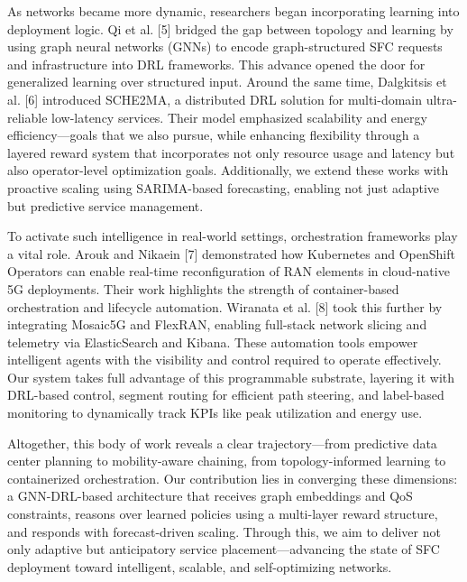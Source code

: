 \documentclass[conference]{IEEEtran}
\begin{document}
As networks became more dynamic, researchers began incorporating learning into deployment logic. Qi et al. [5] bridged the gap between topology and learning by using graph neural networks (GNNs) to encode graph-structured SFC requests and infrastructure into DRL frameworks. This advance opened the door for generalized learning over structured input. Around the same time, Dalgkitsis et al. [6] introduced SCHE2MA, a distributed DRL solution for multi-domain ultra-reliable low-latency services. Their model emphasized scalability and energy efficiency—goals that we also pursue, while enhancing flexibility through a layered reward system that incorporates not only resource usage and latency but also operator-level optimization goals. Additionally, we extend these works with proactive scaling using SARIMA-based forecasting, enabling not just adaptive but predictive service management.

To activate such intelligence in real-world settings, orchestration frameworks play a vital role. Arouk and Nikaein [7] demonstrated how Kubernetes and OpenShift Operators can enable real-time reconfiguration of RAN elements in cloud-native 5G deployments. Their work highlights the strength of container-based orchestration and lifecycle automation. Wiranata et al. [8] took this further by integrating Mosaic5G and FlexRAN, enabling full-stack network slicing and telemetry via ElasticSearch and Kibana. These automation tools empower intelligent agents with the visibility and control required to operate effectively. Our system takes full advantage of this programmable substrate, layering it with DRL-based control, segment routing for efficient path steering, and label-based monitoring to dynamically track KPIs like peak utilization and energy use.

Altogether, this body of work reveals a clear trajectory—from predictive data center planning to mobility-aware chaining, from topology-informed learning to containerized orchestration. Our contribution lies in converging these dimensions: a GNN-DRL-based architecture that receives graph embeddings and QoS constraints, reasons over learned policies using a multi-layer reward structure, and responds with forecast-driven scaling. Through this, we aim to deliver not only adaptive but anticipatory service placement—advancing the state of SFC deployment toward intelligent, scalable, and self-optimizing networks.
\end{document}
